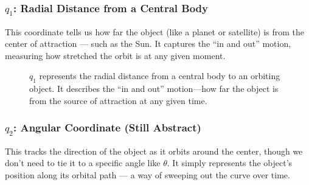 \subsubsection{\( q_1 \): Radial Distance from a Central Body} 
    This coordinate tells us how far the object (like a planet or satellite) is from the center of attraction — such as the Sun. It captures the “in and out” motion, measuring how stretched the orbit is at any given moment.
    
    \begin{figure}[H]
\centering
{}
\caption{\( q_1 \) represents the radial distance from a central body to an orbiting object. It describes the “in and out” motion—how far the object is from the source of attraction at any given time.}
\end{figure}


\subsubsection{\( q_2 \): Angular Coordinate (Still Abstract)} 
    This tracks the direction of the object as it orbits around the center, though we don’t need to tie it to a specific angle like \( \theta \). It simply represents the object’s position along its orbital path — a way of sweeping out the curve over time.


